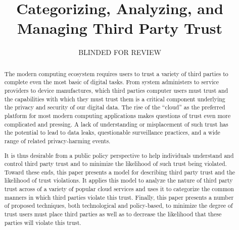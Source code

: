 \documentclass[11pt,letterpaper]{article}
\begin{document}
\title{Categorizing, Analyzing, and Managing Third Party Trust}

\author{BLINDED FOR REVIEW}

\date{}

\maketitle

\begin{abstract}

The modern computing ecosystem requires users to trust a variety of
third parties to complete even the most basic of digital tasks.  From
system administers to service providers to device manufactures, which
third parties computer users must trust and the capabilities with
which they must trust them is a critical component underlying the
privacy and security of our digital data. The rise of the ``cloud'' as
the preferred platform for most modern computing applications makes
questions of trust even more complicated and pressing. A lack of
understanding or misplacement of such trust has the potential to lead
to data leaks, questionable surveillance practices, and a wide range
of related privacy-harming events.

It is thus desirable from a public policy perspective to help
individuals understand and control third party trust and to minimize
the likelihood of such trust being violated. Toward these ends, this
paper presents a model for describing third party trust and the
likelihood of trust violations. It applies this model to analyze the
nature of third party trust across of a variety of popular cloud
services and uses it to categorize the common manners in which third
parties violate this trust. Finally, this paper presents a number of
proposed techniques, both technological and policy-based, to minimize
the degree of trust users must place third parties as well as to
decrease the likelihood that these parties will violate this trust.

\end{abstract}









\end{document}
